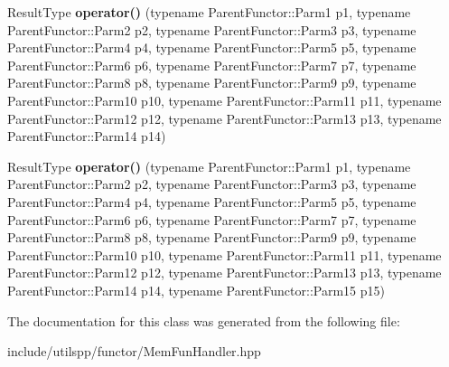 \begin{DoxyCompactItemize}
\item 
\hypertarget{classutilspp_1_1MemFunHandler_a7229a2e7e60263273c9348b5082ca92b}{Result\-Type {\bfseries operator()} (typename Parent\-Functor\-::\-Parm1 p1, typename Parent\-Functor\-::\-Parm2 p2, typename Parent\-Functor\-::\-Parm3 p3, typename Parent\-Functor\-::\-Parm4 p4, typename Parent\-Functor\-::\-Parm5 p5, typename Parent\-Functor\-::\-Parm6 p6, typename Parent\-Functor\-::\-Parm7 p7, typename Parent\-Functor\-::\-Parm8 p8, typename Parent\-Functor\-::\-Parm9 p9, typename Parent\-Functor\-::\-Parm10 p10, typename Parent\-Functor\-::\-Parm11 p11, typename Parent\-Functor\-::\-Parm12 p12, typename Parent\-Functor\-::\-Parm13 p13, typename Parent\-Functor\-::\-Parm14 p14)}\label{classutilspp_1_1MemFunHandler_a7229a2e7e60263273c9348b5082ca92b}

\item 
\hypertarget{classutilspp_1_1MemFunHandler_ac5d35dfd97b4d3c2fb3f4006f0c14c78}{Result\-Type {\bfseries operator()} (typename Parent\-Functor\-::\-Parm1 p1, typename Parent\-Functor\-::\-Parm2 p2, typename Parent\-Functor\-::\-Parm3 p3, typename Parent\-Functor\-::\-Parm4 p4, typename Parent\-Functor\-::\-Parm5 p5, typename Parent\-Functor\-::\-Parm6 p6, typename Parent\-Functor\-::\-Parm7 p7, typename Parent\-Functor\-::\-Parm8 p8, typename Parent\-Functor\-::\-Parm9 p9, typename Parent\-Functor\-::\-Parm10 p10, typename Parent\-Functor\-::\-Parm11 p11, typename Parent\-Functor\-::\-Parm12 p12, typename Parent\-Functor\-::\-Parm13 p13, typename Parent\-Functor\-::\-Parm14 p14, typename Parent\-Functor\-::\-Parm15 p15)}\label{classutilspp_1_1MemFunHandler_ac5d35dfd97b4d3c2fb3f4006f0c14c78}

\end{DoxyCompactItemize}


The documentation for this class was generated from the following file\-:\begin{DoxyCompactItemize}
\item 
include/utilspp/functor/Mem\-Fun\-Handler.\-hpp\end{DoxyCompactItemize}
